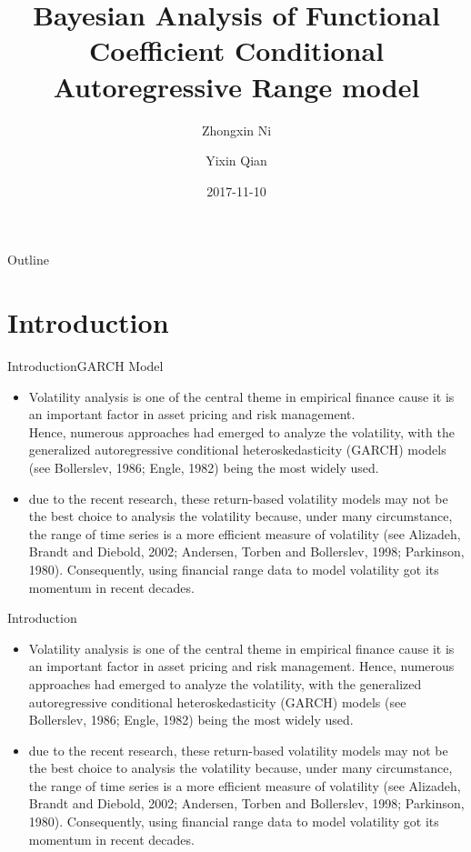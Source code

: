 \documentclass{beamer}
\title{Bayesian Analysis of Functional Coefficient Conditional
Autoregressive Range model}
\subtitle{}
\author{Zhongxin Ni\inst{1} \and Yixin Qian\inst{1}}
\institute[School of Economics, Shanghai University, Shanghai] %
{
  \inst{1}%
  School of Economics, Shanghai University
}
\date{2017-11-10}
\begin{document}
\begin{frame}
  \titlepage
\end{frame}

\begin{frame}{Outline}
  \tableofcontents
\end{frame}

\section{Introduction}

\begin{frame}{Introduction}{GARCH Model}
  \begin{itemize}
  \item {
    Volatility analysis is one of the central theme in empirical finance cause it is an important
    factor in asset pricing and risk management. \\
    Hence, numerous approaches had emerged to analyze the volatility, with the generalized autoregressive conditional heteroskedasticity (GARCH) models (see Bollerslev, 1986; Engle, 1982) being the most widely used. 
  }
  \item {
    due to the recent research, these return-based volatility models may not be the
best choice to analysis the volatility because, under many circumstance, the range of time
series is a more efficient measure of volatility (see Alizadeh, Brandt and Diebold, 2002; Andersen, Torben and Bollerslev, 1998; Parkinson, 1980). Consequently, using financial range
data to model volatility got its momentum in recent decades.
  }
  \end{itemize}
\end{frame}


\begin{frame}{Introduction}
  \begin{itemize}
  \item {
    Volatility analysis is one of the central theme in empirical finance cause it is an important
factor in asset pricing and risk management. Hence, numerous approaches had emerged
to analyze the volatility, with the generalized autoregressive conditional heteroskedasticity
(GARCH) models (see Bollerslev, 1986; Engle, 1982) being the most widely used. 
  }
  \item {
    due to the recent research, these return-based volatility models may not be the
best choice to analysis the volatility because, under many circumstance, the range of time
series is a more efficient measure of volatility (see Alizadeh, Brandt and Diebold, 2002; Andersen, Torben and Bollerslev, 1998; Parkinson, 1980). Consequently, using financial range
data to model volatility got its momentum in recent decades.
  }
  \end{itemize}
\end{frame}
\end{document}
